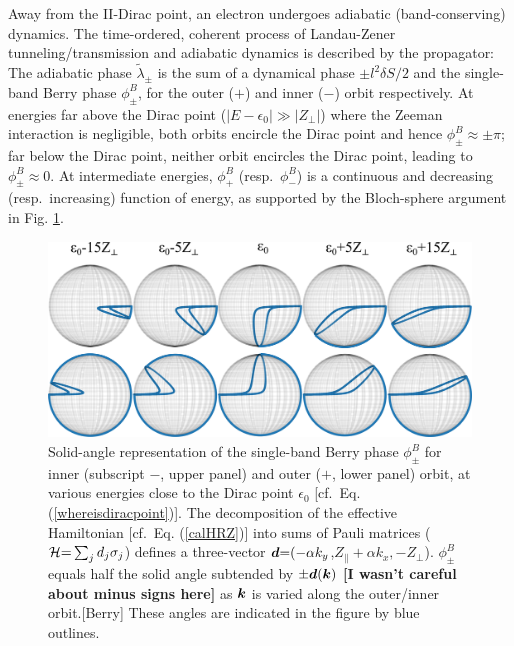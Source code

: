 \documentclass[aps, prb, showpacs, twocolumn, notitlepage, superscriptaddress]{revtex4-1}
\begin{document}
Away from the II-Dirac point, an electron undergoes adiabatic (band-conserving) dynamics. The time-ordered, coherent process of Landau-Zener tunneling/transmission and adiabatic dynamics is described by the propagator:
The adiabatic phase $\tilde{\lambda}_{\pm}$ is the sum of a dynamical phase ${\pm} l^2 \delta S/2$ and  the single-band Berry phase $\phi^B_\pm$, for the outer ($+$) and inner ($-$) orbit respectively. At energies far above the Dirac point ($|E{-}\epsilon_0|{\gg}|Z_{\perp}|$) where the Zeeman interaction is negligible, both orbits encircle the Dirac point and hence $\phi_{\pm}^B{\approx}{\pm}\pi$; far below the Dirac point, neither orbit encircles the Dirac point, leading to $\phi_{\pm}^B{\approx}0$. At intermediate energies, $\phi_{+}^B$ (resp.\ $\phi_{-}^B$) is a continuous and decreasing (resp.\ increasing) function of energy, as supported by the Bloch-sphere argument in Fig. \ref{fig:blochsphere}.




\begin{figure}
\includegraphics[width=1.0\columnwidth]{blochsphere.png}
\caption{Solid-angle representation of  the single-band Berry phase $\phi_{\pm}^B$ for inner (subscript $-$, upper panel) and outer ($+$, lower panel) orbit, at various energies close to the Dirac point $\epsilon_0$ [cf.\ Eq. (\ref{whereisdiracpoint})]. The decomposition of the effective Hamiltonian [cf.\ Eq. (\ref{calHRZ})] into sums of Pauli matrices (${\cal H}{=}\sum_jd_j\sigma_j$) defines a three-vector $\boldsymbol{d}{=}({-}\alpha k_y$,$Z_\parallel{+}\alpha k_x,{-}Z_\perp$).
 $\phi_{\pm}^B$  equals half the solid angle subtended by   ${\pm} \boldsymbol{d}(\boldsymbol{k})$ \textbf{[I wasn't  careful about minus signs here]} as $\boldsymbol{k}$ is varied along the outer/inner orbit.[Berry]   These angles are indicated in the figure by blue outlines.\label{fig:blochsphere}}
\end{figure}
\end{document}
